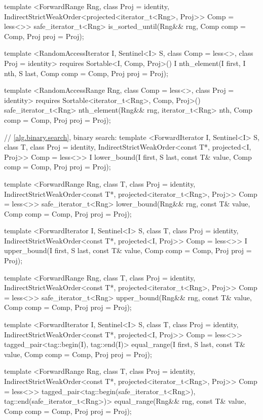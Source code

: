 \begin{codeblock}
{{{{  template <ForwardRange Rng, class Proj = identity,
      IndirectStrictWeakOrder<projected<iterator_t<Rng>, Proj>> Comp = less<>>
    safe_iterator_t<Rng>
      is_sorted_until(Rng&& rng, Comp comp = Comp{}, Proj proj = Proj{});

  template <RandomAccessIterator I, Sentinel<I> S, class Comp = less<>,
      class Proj = identity>
    requires Sortable<I, Comp, Proj>()
    I nth_element(I first, I nth, S last, Comp comp = Comp{}, Proj proj = Proj{});

  template <RandomAccessRange Rng, class Comp = less<>, class Proj = identity>
    requires Sortable<iterator_t<Rng>, Comp, Proj>()
    safe_iterator_t<Rng>
      nth_element(Rng&& rng, iterator_t<Rng> nth, Comp comp = Comp{}, Proj proj = Proj{});

  // \ref{alg.binary.search}, binary search:
  template <ForwardIterator I, Sentinel<I> S, class T, class Proj = identity,
      IndirectStrictWeakOrder<const T*, projected<I, Proj>> Comp = less<>>
    I
      lower_bound(I first, S last, const T& value, Comp comp = Comp{},
                  Proj proj = Proj{});

  template <ForwardRange Rng, class T, class Proj = identity,
      IndirectStrictWeakOrder<const T*, projected<iterator_t<Rng>, Proj>> Comp = less<>>
    safe_iterator_t<Rng>
      lower_bound(Rng&& rng, const T& value, Comp comp = Comp{}, Proj proj = Proj{});

  template <ForwardIterator I, Sentinel<I> S, class T, class Proj = identity,
      IndirectStrictWeakOrder<const T*, projected<I, Proj>> Comp = less<>>
    I
      upper_bound(I first, S last, const T& value, Comp comp = Comp{}, Proj proj = Proj{});

  template <ForwardRange Rng, class T, class Proj = identity,
      IndirectStrictWeakOrder<const T*, projected<iterator_t<Rng>, Proj>> Comp = less<>>
    safe_iterator_t<Rng>
      upper_bound(Rng&& rng, const T& value, Comp comp = Comp{}, Proj proj = Proj{});

  template <ForwardIterator I, Sentinel<I> S, class T, class Proj = identity,
      IndirectStrictWeakOrder<const T*, projected<I, Proj>> Comp = less<>>
    tagged_pair<tag::begin(I), tag::end(I)>
      equal_range(I first, S last, const T& value, Comp comp = Comp{}, Proj proj = Proj{});

  template <ForwardRange Rng, class T, class Proj = identity,
      IndirectStrictWeakOrder<const T*, projected<iterator_t<Rng>, Proj>> Comp = less<>>
    tagged_pair<tag::begin(safe_iterator_t<Rng>),
                tag::end(safe_iterator_t<Rng>)>
      equal_range(Rng&& rng, const T& value, Comp comp = Comp{}, Proj proj = Proj{});

}}}}
\end{codeblock}
